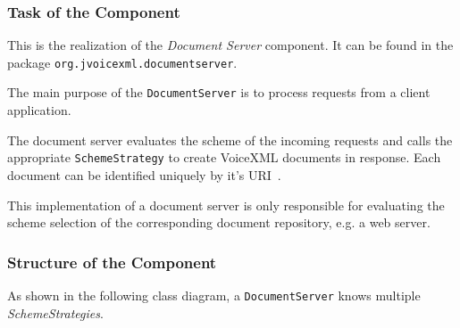 \documentclass[11pt,a4paper]{article}
\begin{document}
\subsubsection{Task of the Component}

This is the realization of the \emph{Document Server} component. It can be found
in the package \texttt{org.jvoicexml.documentserver}.

The main purpose of the \texttt{DocumentServer} is to process requests from a 
client application.

The document server evaluates the scheme of the incoming requests and
calls the appropriate \texttt{SchemeStrategy} to create VoiceXML
documents in response. Each document can be identified uniquely by
it's URI~\cite{w3.org:addressing}.

This implementation of a document server is only responsible for
evaluating the scheme selection of the corresponding document repository,
e.g. a web server.

\subsubsection{Structure of the Component}

As shown in the following class diagram, a \texttt{DocumentServer}
knows multiple \emph{SchemeStrategies}.

\begin{center}
\end{center}
\end{document}
